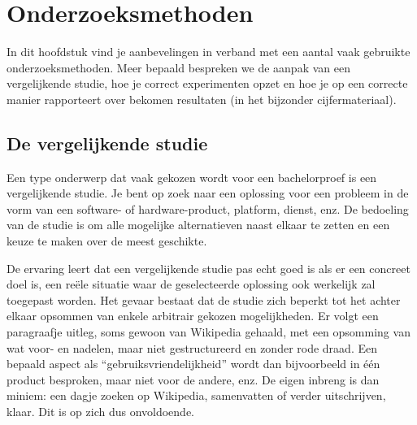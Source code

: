 \chapter{Onderzoeksmethoden}%
\label{ch:onderzoeksmethoden}

In dit hoofdstuk vind je aanbevelingen in verband met een aantal vaak gebruikte onderzoeksmethoden. Meer bepaald bespreken we de aanpak van een vergelijkende studie, hoe je correct experimenten opzet en hoe je op een correcte manier rapporteert over bekomen resultaten (in het bijzonder cijfermateriaal).

%
%

\section{De vergelijkende studie}%
\label{sec:vergelijkende-studie}

Een type onderwerp dat vaak gekozen wordt voor een bachelorproef is een vergelijkende studie. Je bent op zoek naar een oplossing voor een probleem in de vorm van een software- of hardware-product, platform, dienst, enz. De bedoeling van de studie is om alle mogelijke alternatieven naast elkaar te zetten en een keuze te maken over de meest geschikte.

De ervaring leert dat een vergelijkende studie pas echt goed is als er een concreet doel is, een reële situatie waar de geselecteerde oplossing ook werkelijk zal toegepast worden. Het gevaar bestaat dat de studie zich beperkt tot het achter elkaar opsommen van enkele arbitrair gekozen mogelijkheden. Er volgt een paragraafje uitleg, soms gewoon van Wikipedia gehaald, met een opsomming van wat voor- en nadelen, maar niet gestructureerd en zonder rode draad. Een bepaald aspect als ``gebruiksvriendelijkheid'' wordt dan bijvoorbeeld in één product besproken, maar niet voor de andere, enz. De eigen inbreng is dan miniem: een dagje zoeken op Wikipedia, samenvatten of verder uitschrijven, klaar. Dit is op zich dus onvoldoende.

